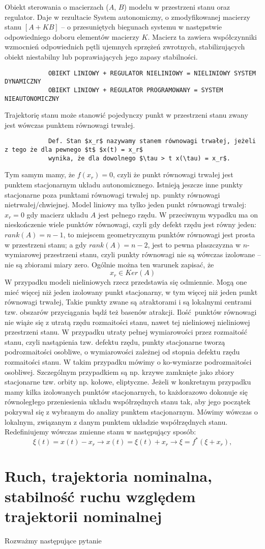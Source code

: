 \documentclass{article}
\begin{document}
		Obiekt sterowania o macierzach ($A$, $B$) modelu w przestrzeni stanu oraz regulator. Daje w rezultacie
		System autonomiczny, o zmodyfikowanej macierzy stanu $[A+KB]$ – o przesuniętych biegunach
		systemu w następstwie odpowiedniego doboru elementów macierzy $K$. Macierz ta zawiera współczynniki
		wzmocnień odpowiednich pętli ujemnych sprzężeń zwrotnych, stabilizujących obiekt
		niestabilny lub poprawiających jego zapasy stabilności.
		\begin{verbatim}
			OBIEKT LINIOWY + REGULATOR NIELINIOWY = NIELINIOWY SYSTEM DYNAMICZNY
			OBIEKT LINIOWY + REGULATOR PROGRAMOWANY = SYSTEM NIEAUTONOMICZNY
		\end{verbatim}
		Trajektorię stanu może stanowić pojedynczy punkt w przestrzeni stanu zwany jest wówczas
		punktem równowagi trwałej.
		\begin{verbatim}
			Def. Stan $x_r$ nazywamy stanem równowagi trwałej, jeżeli z tego że dla pewnego $t$ $x(t) = x_r$
			wynika, że dla dowolnego $\tau > t x(\tau) = x_r$.
		\end{verbatim}
		Tym samym mamy, że $f(x_r) = 0$, czyli że punkt równowagi trwałej jest punktem stacjonarnym
		układu autonomicznego.
		Istnieją jeszcze inne punkty stacjonarne poza punktami równowagi trwałej np. punkty
		równowagi nietrwałej/chwiejnej.
		Model liniowy ma tylko jeden punkt równowagi trwałej: $x_r = 0$ gdy macierz układu $A$ jest
		pełnego rzędu. W przeciwnym wypadku ma on nieskończenie wiele
		punktów równowagi, czyli gdy defekt rzędu jest równy jeden: $rank(A) = n-1$, to miejscem
		geometrycznym punktów równowagi jest prosta w przestrzeni stanu; a gdy $rank(A) = n-2$, jest
		to pewna płaszczyzna w $n$-wymiarowej przestrzeni stanu, czyli punkty równowagi nie są
		wówczas izolowane – nie są zbiorami miary zero. Ogólnie można ten warunek zapisać, że
		\begin{equation}
			x_r \in Ker(A)
		\end{equation}
		W przypadku modeli nieliniowych rzecz przedstawia się odmiennie. Mogą one mieć więcej niż
		jeden izolowany punkt stacjonarny, w tym więcej niż jeden punkt równowagi trwałej,
		Takie punkty zwane są atraktorami i są lokalnymi centrami tzw. obszarów przyciągania
		bądź też basenów atrakcji. Ilość punktów równowagi nie wiąże się z utratą rzędu
		rozmaitości stanu, nawet tej nieliniowej nieliniowej przestrzeni stanu.
		W przypadku utraty pełnej wymiarowości przez rozmaitość stanu, czyli nastąpienia tzw. defektu rzędu, punkty
		stacjonarne tworzą podrozmaitości osobliwe,
		o wymiarowości zależnej od stopnia defektu rzędu rozmaitości stanu. W takim
		przypadku mówimy o ko-wymiarze podrozmaitości osobliwej. Szczególnym przypadkiem są
		np. krzywe zamknięte jako zbiory stacjonarne tzw. orbity np. kołowe, eliptyczne.
		Jeżeli w konkretnym przypadku mamy kilka izolowanych punktów stacjonarnych, to
		każdorazowo dokonuje się równoległego przeniesienia układu współrzędnych stanu
		tak, aby jego początek pokrywał się z wybranym do analizy punktem stacjonarnym.
		Mówimy wówczas o lokalnym, związanym z danym punktem układzie współrzędnych stanu.
		Redefiniujemy wówczas zmienne stanu w następujący sposób:
		\begin{equation}
			\xi(t) = x(t)-x_r \to x(t) = \xi(t) + x_r \to \xi = f^*(\xi+x_r),	
		\end{equation}
	\section{Ruch, trajektoria nominalna, stabilność ruchu względem trajektorii nominalnej}
		Rozważmy następujące pytanie
\end{document}
